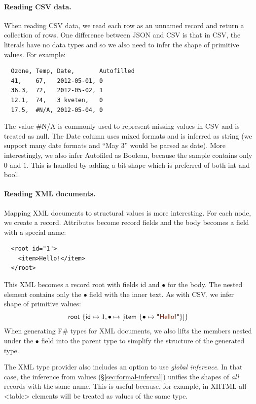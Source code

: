 \documentclass[10pt,preprint,clearpagebib]{sigplanconf}
\newcommand{\kvd}[1]{\textnormal{\textcolor{kvdclr}{\sffamily #1}}}
\newcommand{\str}[1]{\textnormal{\textcolor{strclr}{\sffamily "#1"}}}
\newcommand{\ident}[1]{\textnormal{\sffamily #1}}
\begin{document}
\paragraph{Reading CSV data.}
When reading CSV data, we read each row as an unnamed record and return a collection of rows.
One difference between JSON and CSV is that in CSV, the literals have no data types and so 
we also need to infer the shape of primitive values. For example:
%
{\small{
\begin{verbatim}
  Ozone, Temp, Date,       Autofilled
  41,    67,   2012-05-01, 0
  36.3,  72,   2012-05-02, 1
  12.1,  74,   3 kveten,   0
  17.5,  #N/A, 2012-05-04, 0
\end{verbatim}
}}
%
\noindent
The value {\small\ttfamily \#N/A} is commonly used to represent missing values in CSV and is treated
as \kvd{null}. The \ident{Date} column uses mixed formats and is inferred as \ident{string} 
(we support many date formats and ``May 3'' would be parsed as date). More interestingly,
we also infer \ident{Autofiled} as Boolean, because the sample contains only $0$ and $1$.
This is handled by adding a \ident{bit} shape which is preferred of both \ident{int} and \ident{bool}.

\paragraph{Reading XML documents.}
Mapping XML documents to structural values is more interesting. For each node, we
create a record. Attributes become record fields and the body becomes a field with a special
name:
%
{\small{
\begin{verbatim}
  <root id="1">
    <item>Hello!</item>
  </root>    
\end{verbatim}
}}
%
\noindent
This XML becomes a record \ident{root} with fields \ident{id} and $\bullet$ for the body. 
The nested element contains only the $\bullet$ field with the inner text. As with CSV, we
infer shape of primitive values:
%
\begin{equation*}
\ident{root}~\{ \ident{id} \mapsto 1, \bullet \mapsto [ \ident{item}~\{ \bullet \mapsto \str{Hello!} \}] \}
\end{equation*}
%
When generating F\# types for XML documents, we also lifts the members nested under the $\bullet$ 
field into the parent type to simplify the structure of the generated type.

The XML type provider also includes an option to use \emph{global inference}. In that case, 
the inference from values (\S\ref{sec:formal-inferval}) unifies the shapes of \emph{all} records with the 
same name. This is useful because, for example, in XHTML all {\small\ttfamily <table>} elements
will be treated as values of the same type.
\end{document}
